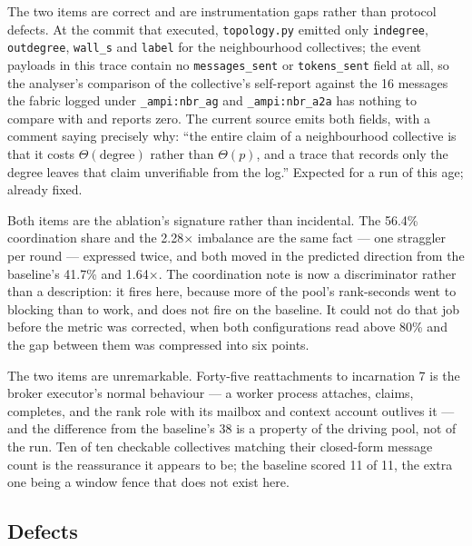 \documentclass[11pt]{article}
\begin{document}
The two  items are correct and are instrumentation gaps rather than protocol
defects. At the commit that executed, \texttt{topology.py} emitted only \texttt{indegree},
\texttt{outdegree}, \texttt{wall\_s} and \texttt{label} for the neighbourhood collectives; the
event payloads in this trace contain no \texttt{messages\_sent} or \texttt{tokens\_sent} field at
all, so the analyser's comparison of the collective's self-report against the 16 messages the
fabric logged under \texttt{\_ampi:nbr\_ag} and \texttt{\_ampi:nbr\_a2a} has nothing to compare
with and reports zero. The current source emits both fields, with a comment saying precisely why:
``the entire claim of a neighbourhood collective is that it costs $\Theta(\mathrm{degree})$ rather
than $\Theta(p)$, and a trace that records only the degree leaves that claim unverifiable from the
log.'' Expected for a run of this age; already fixed.

Both  items are the ablation's signature rather than incidental. The 56.4\%
coordination share and the 2.28$\times$ imbalance are the same fact --- one straggler per round
--- expressed twice, and both moved in the predicted direction from the baseline's 41.7\% and
1.64$\times$. The coordination note is now a discriminator rather than a description: it fires
here, because more of the pool's rank-seconds went to blocking than to work, and does not fire
on the baseline. It could not do that job before the metric was corrected, when both
configurations read above 80\% and the gap between them was compressed into six points.

The two  items are unremarkable. Forty-five reattachments to incarnation 7 is the
broker executor's normal behaviour --- a worker process attaches, claims, completes, and the rank
role with its mailbox and context account outlives it --- and the difference from the baseline's
38 is a property of the driving pool, not of the run. Ten of ten checkable collectives matching
their closed-form message count is the reassurance it appears to be; the baseline scored 11 of 11,
the extra one being a window fence that does not exist here.

\subsection{Defects}
\label{sec:defects}
\end{document}
